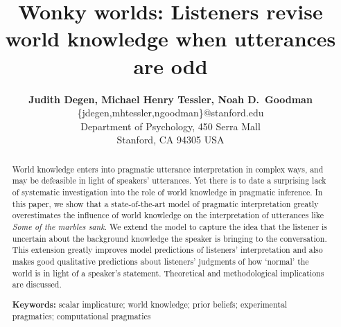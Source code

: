 \documentclass[10pt,letterpaper]{article}
\title{Wonky worlds: Listeners revise world knowledge when utterances are odd}
\author{{\large \bf Judith Degen, Michael Henry Tessler, Noah D.~Goodman} \\
  \{jdegen,mhtessler,ngoodman\}@stanford.edu\\
  Department of Psychology, 450 Serra Mall \\
  Stanford, CA 94305 USA}
\newcommand{\red}[1]{\textcolor{Red}{#1}}
\begin{document}
\maketitle


\begin{abstract}
World knowledge enters into pragmatic utterance interpretation in complex ways, and may be defeasible in light of speakers' utterances.  Yet there is to date a surprising lack of systematic investigation into the role of world knowledge in pragmatic inference. In this paper, we show that a state-of-the-art model of pragmatic interpretation greatly overestimates the influence of world knowledge on the interpretation of utterances like \emph{Some of the marbles sank}. We extend the model to capture the idea that  the listener is uncertain about the background knowledge the speaker is bringing to the conversation. This extension greatly improves model predictions of listeners' interpretation and also makes good qualitative predictions about listeners' judgments of how `normal' the world is in light of a speaker's statement. Theoretical and methodological implications are discussed.


\textbf{Keywords:} 
scalar implicature; world knowledge; prior beliefs; experimental pragmatics; computational pragmatics
\end{abstract}
\end{document}
